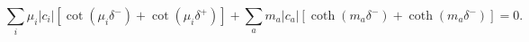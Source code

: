 \begin{equation}
\label{adddelta}
\sum_i \mu_i |c_i| [\cot(\mu_i  \delta^-)+\cot(\mu_i  \delta^+)] + 
\sum_a m_a |c_a| [\coth(m_a  \delta^-) + \coth(m_a  \delta^-)]= 0.
\end{equation}

